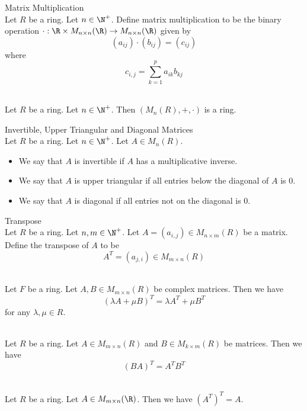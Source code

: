 \documentclass[a4paper]{article}
\begin{document}
\begin{defn}{Matrix Multiplication}{}\\
Let $R$ be a ring. Let $n\in\N^+$. Define matrix multiplication to be the binary operation $\cdot:\R\times M_{n\times n}(\R)\to M_{n\times n}(\R)$ given by $$(a_{ij})\cdot(b_{ij})=(c_{ij})$$ where $$c_{i,j}=\sum_{k=1}^pa_{ik}b_{kj}$$
\end{defn}

\begin{prp}{}{}\\
Let $R$ be a ring. Let $n\in\N^+$. Then $(M_n(R),+,\cdot)$ is a ring. 
\end{prp}

\begin{defn}{Invertible, Upper Triangular and Diagonal Matrices}{}\\
Let $R$ be a ring. Let $n\in\N^+$. Let $A\in M_n(R)$. 
\begin{itemize}
\item We say that $A$ is invertible if $A$ has a multiplicative inverse. 
\item We say that $A$ is upper triangular if all entries below the diagonal of $A$ is $0$. 
\item We say that $A$ is diagonal if all entries not on the diagonal is $0$. 
\end{itemize}
\end{defn}

\begin{defn}{Transpose}{}\\
Let $R$ be a ring. Let $n,m\in\N^+$. Let $A=(a_{i,j})\in M_{n\times m}(R)$ be a matrix. Define the transpose of $A$ to be $$A^T=(a_{j,i})\in M_{m\times n}(R)$$
\end{defn}

\begin{prp}{}{}\\
Let $F$ be a ring. Let $A,B\in M_{m\times n}(R)$ be complex matrices. Then we have $$(\lambda A+\mu B)^T=\lambda A^T+\mu B^T$$ for any $\lambda,\mu\in R$. 
\end{prp}

\begin{prp}{}{}\\
Let $R$ be a ring. Let $A\in M_{m\times n}(R)$ and $B\in M_{k\times m}(R)$ be matrices. Then we have $$(BA)^T=A^TB^T$$
\end{prp}

\begin{prp}{}{}\\
Let $R$ be a ring. Let $A\in M_{m\times n}(\R)$. Then we have $(A^T)^T=A$. 
\end{prp}
\end{document}
